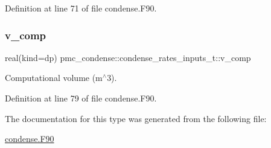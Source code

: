 Definition at line 71 of file condense.\+F90.

\mbox{\label{structpmc__condense_1_1condense__rates__inputs__t_a88c0bdb2315d49bebf0a3df9d79ee804}} 
\subsubsection{\texorpdfstring{v\+\_\+comp}{v\_comp}}
{\footnotesize\ttfamily real(kind=dp) pmc\+\_\+condense\+::condense\+\_\+rates\+\_\+inputs\+\_\+t\+::v\+\_\+comp}



Computational volume (m$^\wedge$3). 



Definition at line 79 of file condense.\+F90.



The documentation for this type was generated from the following file\+:\begin{DoxyCompactItemize}
\item 
\mbox{\hyperlink{condense_8_f90}{condense.\+F90}}\end{DoxyCompactItemize}
